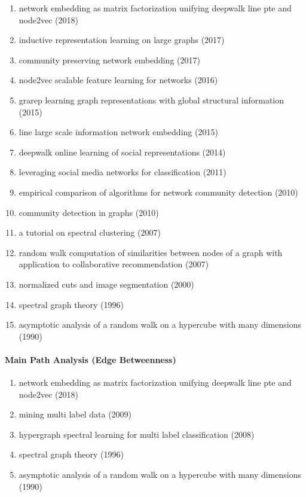 \documentclass[lettepaper,]{article}
\providecommand{\tightlist}{%
  \setlength{\itemsep}{0pt}\setlength{\parskip}{0pt}}
\let\oldparagraph\paragraph
\renewcommand{\paragraph}[1]{\oldparagraph{#1}\mbox{}}
\begin{document}
\begin{enumerate}
\def\labelenumi{\arabic{enumi}.}
\tightlist
\item
  network embedding as matrix factorization unifying deepwalk line pte
  and node2vec (2018)
\item
  inductive representation learning on large graphs (2017)
\item
  community preserving network embedding (2017)
\item
  node2vec scalable feature learning for networks (2016)
\item
  grarep learning graph representations with global structural
  information (2015)
\item
  line large scale information network embedding (2015)
\item
  deepwalk online learning of social representations (2014)
\item
  leveraging social media networks for classification (2011)
\item
  empirical comparison of algorithms for network community detection
  (2010)
\item
  community detection in graphs (2010)
\item
  a tutorial on spectral clustering (2007)
\item
  random walk computation of similarities between nodes of a graph with
  application to collaborative recommendation (2007)
\item
  normalized cuts and image segmentation (2000)
\item
  spectral graph theory (1996)
\item
  asymptotic analysis of a random walk on a hypercube with many
  dimensions (1990)
\end{enumerate}

\hypertarget{main-path-analysis-edge-betweenness-2}{%
\paragraph{Main Path Analysis (Edge
Betweenness)}\label{main-path-analysis-edge-betweenness-2}}

\begin{enumerate}
\def\labelenumi{\arabic{enumi}.}
\tightlist
\item
  network embedding as matrix factorization unifying deepwalk line pte
  and node2vec (2018)
\item
  mining multi label data (2009)
\item
  hypergraph spectral learning for multi label classification (2008)
\item
  spectral graph theory (1996)
\item
  asymptotic analysis of a random walk on a hypercube with many
  dimensions (1990)
\end{enumerate}
\end{document}
